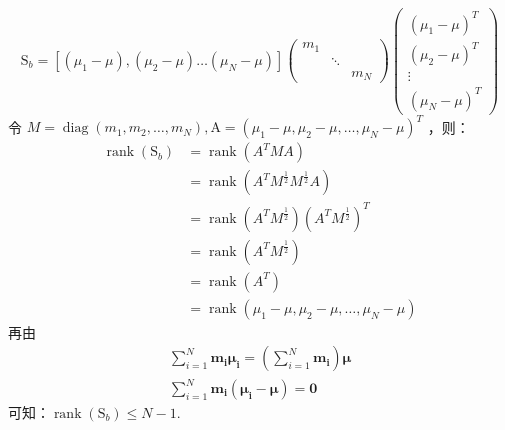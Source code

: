 \documentclass[UTF8,a4paper,AutoFakeBold,AutoFakeSlant]{article}
\begin{document}
\begin{equation*}
  \mathrm{S}_{b}= \left[\left(\mu_{1}-\mu\right),\left(\mu_{2}-\mu\right) \ldots\left(\mu_{N}-\mu\right)\right]\left(\begin{array}{lll}
      m_{1} &        &       \\
            & \ddots &       \\
            &        & m_{N}
    \end{array}\right)\left(\begin{array}{l}
      \left(\mu_{1}-\mu\right)^{T} \\
      \left(\mu_{2}-\mu\right)^{T} \\
      \vdots                       \\
      \left(\mu_{N}-\mu\right)^{T}
    \end{array}\right)
\end{equation*}
令 $M=\operatorname{diag}\left(m_{1}, m_{2}, \ldots, m_{N}\right), \mathrm{A}=\left(\mu_{1}-\mu, \mu_{2}-\mu, \ldots, \mu_{N}-\mu\right)^{T}$ ，则：
\begin{equation*}
  \begin{aligned}
    \operatorname{rank} (\mathrm{S}_{b}) & =\operatorname{rank} (A^{T} M A)                                                             \\
                                         & =\operatorname{rank} (A^{T} M^{\frac{1}{2}} M^{\frac{1}{2}} A)                               \\
                                         & =\operatorname{rank}\left(A^{T} M^{\frac{1}{2}}\right)\left(A^{T} M^{\frac{1}{2}}\right)^{T} \\
                                         & =\operatorname{rank}\left(A^{T} M^{\frac{1}{2}}\right)                                       \\
                                         & =\operatorname{rank} (A^{T})                                                                 \\
                                         & =\operatorname{rank}\left(\mu_{1}-\mu, \mu_{2}-\mu, \ldots, \mu_{N}-\mu\right)
  \end{aligned}
\end{equation*}
再由
\begin{equation*}
  \begin{aligned}
    \sum_{i=1}^{N} \boldsymbol{m}_{\boldsymbol{i}} \boldsymbol{\mu}_{\boldsymbol{i}}=\left(\sum_{i=1}^{N} \boldsymbol{m}_{\boldsymbol{i}}\right) \boldsymbol{\mu} \\
    \sum_{i=1}^{N} \boldsymbol{m}_{\boldsymbol{i}}\left(\boldsymbol{\mu}_{\boldsymbol{i}}-\boldsymbol{\mu}\right)=\mathbf{0}
  \end{aligned}
\end{equation*}
可知：$ \operatorname{rank} (\mathrm{S}_{b}) \leq N-1 $.
\end{document}

